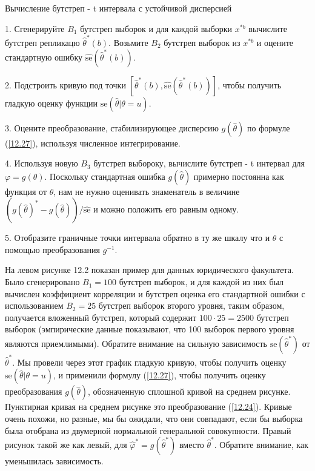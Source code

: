 \begin{algorithm}
\caption{Вычисление бутстреп - t интервала с устойчивой дисперсией}
1. Сгенерируйте $B_{1}$ бутстреп выборок и для каждой выборки $x^{*b}$ вычислите бутстреп репликацю $\widehat{\theta}^{*}(b)$. Возьмите $B_{2}$ бутстреп выборок из $x^{*b}$ и оцените стандартную ошибку
$\widehat{\text{se}}(\widehat{\theta}^{*}(b))$.

2. Подстроить кривую под точки $[\widehat{\theta}^{*}(b), \widehat{\text{se}}(\widehat{\theta}^{*}(b))]$, чтобы получить гладкую оценку функции $\text{se}(\widehat{\theta}|\theta = u)$.

3. Оцените преобразование, стабилизирующее дисперсию $g(\widehat{\theta})$ по формуле (\ref{12.27}), используя численное интегрирование.

4. Используя новую $B_{3}$ бутстреп выбороку, вычислите бутстреп - t интервал для $\varphi = g(\theta)$. Поскольку стандартная ошибка $g(\widehat{\theta})$ примерно постоянна как функция от $\theta$, нам не нужно оценивать знаменатель в величине $(g(\widehat{\theta})^{*} - g(\widehat{\theta})) / \widehat{\text{se}}$ и можно положить его равным одному.

5. Отобразите граничные точки интервала обратно в ту же шкалу что и $\theta$ с помощью преобразования $g^{-1}$.
\end{algorithm}

На левом рисунке 12.2 показан пример для данных юридического факультета. Было сгенерировано $B_{1} = 100$ бутстреп выборок, и для каждой из них был вычислен коэффициент корреляции и бутстреп оценка его стандартной ошибки с использованием $B_{2} = 25$ бутстреп выборок второго уровня, таким образом, получается вложенный бутстреп, который содержит $100 \cdot 25 = 2500$ бутстреп выборок (эмпирические данные показывают, что 100 выборок первого уровня являются приемлимыми). Обратите внимание на сильную зависимость $\text{se}(\widehat{\theta}^{*})$ от ${\widehat{\theta}}^{*}$. Мы провели через этот график гладкую кривую, чтобы получить оценку $\text{se}(\widehat{\theta}|\theta = u)$, и применили формулу (\ref{12.27}), чтобы получить оценку преобразования $g(\widehat{\theta})$, обозначенную сплошной кривой на среднем рисунке. Пунктирная кривая на среднем рисунке это преобразование (\ref{12.24}). Кривые очень похожи, но разные, мы бы ожидали, что они совпадают, если бы выборка была отобрана из двумерной нормальной генеральной совокупности. Правый рисунок такой же как левый, для $\widehat{\varphi}^{*} = g(\widehat{\theta}^{*})$ вместо $\widehat{\theta}^{*}$. Обратите внимание, как уменьшилась зависимость.

